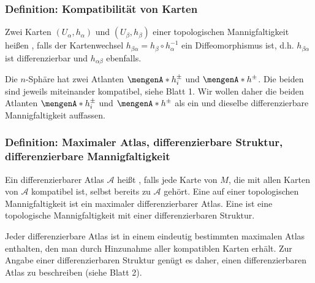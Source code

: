 \subsubsection{Definition: Kompatibilität von Karten} %
\label{ssub:124}
Zwei Karten $(U_\alpha, h_\alpha)$ und $(U_\beta, h_\beta)$ einer topologischen Mannigfaltigkeit heißen , falls der Kartenwechsel $h_{\beta \alpha} = h_\beta \circ h_\alpha ^{-1}$ ein Diffeomorphismus ist, d.h. $h_{\beta \alpha}$ ist differenzierbar und $h_{\alpha \beta}$ ebenfalls.

\bigskip
Die $n$-Sphäre hat zwei Atlanten $\set{h_i^\pm} $ und $\set{h^\pm} $. Die beiden sind jeweils miteinander kompatibel, siehe Blatt 1. Wir wollen daher die beiden Atlanten
$\set{h_i^\pm} $ und $\set{h^\pm} $ als ein und dieselbe differenzierbare Mannigfaltigkeit auffassen.

\subsubsection{Definition: Maximaler Atlas, differenzierbare Struktur, differenzierbare Mannigfaltigkeit} %
\label{ssub:125}
Ein differenzierbarer Atlas $\mathcal{A} $ heißt , falls jede Karte von $M$, die mit allen Karten von $\mathcal{A} $ kompatibel ist, selbst bereits zu 
$\mathcal{A}$ gehört. Eine  auf einer topologischen Mannigfaltigkeit ist ein maximaler differenzierbarer Atlas. Eine 
 ist eine topologische Mannigfaltigkeit mit einer differenzierbaren Struktur.

Jeder differenzierbare Atlas ist in einem eindeutig bestimmten maximalen Atlas enthalten, den man durch Hinzunahme aller kompatiblen Karten erhält. Zur Angabe einer 
differenzierbaren Struktur genügt es daher, einen differenzierbaren Atlas zu beschreiben (siehe Blatt 2).

